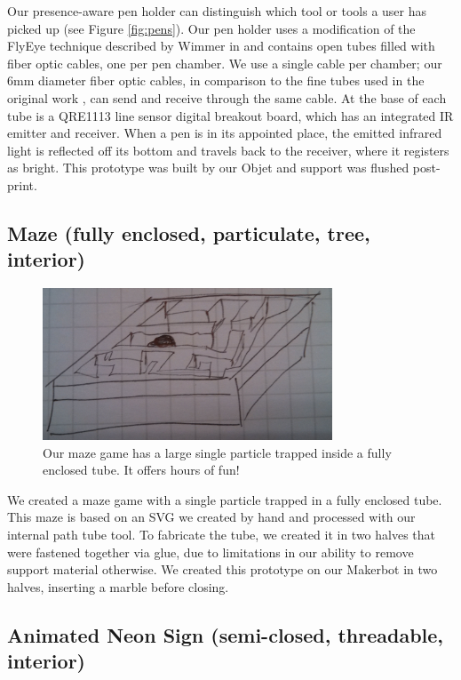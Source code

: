 Our presence-aware pen holder can distinguish which tool or tools a user has picked up (see Figure \ref{fig:pens}).  Our pen holder uses a modification of the FlyEye technique described by Wimmer in \cite{Wimmer-flyeye} and contains open tubes filled with fiber optic cables, one per pen chamber.  We use a single cable per chamber; our 6mm diameter fiber optic cables, in comparison to the fine tubes used in the original work , can send and receive through the same cable.  At the base of each tube is a QRE1113 line sensor digital breakout board, which has an integrated IR emitter and receiver.   When a pen is in its appointed place, the emitted infrared light is reflected off its bottom and travels back to the receiver, where it registers as bright.  This prototype was built by our Objet and support was flushed post-print. 

\subsection{Maze (fully enclosed, particulate, tree, interior)}

\begin{figure}[h]
\centering
    \includegraphics[width=3.4in]{figures/placeholder/maze.jpg}
\caption{Our maze game has a large single particle trapped inside a fully enclosed tube.  It offers hours of fun!}
\label{fig:maze}
\end{figure}

We created a maze game with a single particle trapped in a fully enclosed tube.  This maze is based on an SVG we created by hand and processed with our internal path tube tool.  To fabricate the tube, we created it in two halves that were fastened together via glue, due to limitations in our ability to remove support material otherwise.  We created this prototype on our Makerbot in two halves, inserting a marble before closing.

\subsection{Animated Neon Sign (semi-closed, threadable, interior)}

